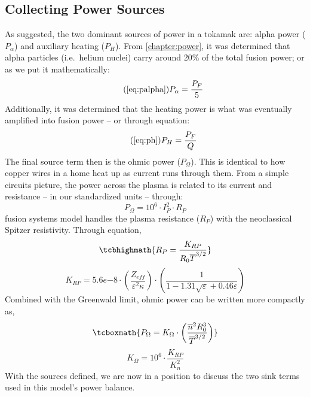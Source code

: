 \subsection{Collecting Power Sources}

As suggested, the two dominant sources of power in a tokamak are: alpha power ($P_\alpha$) and auxiliary heating ($P_H$). From \cref{chapter:power}, it was determined that alpha particles (i.e.\ helium nuclei) carry around 20\% of the total fusion power; or as we put it mathematically:
\begin{equation}
	\tag{\ref{eq:palpha}}
	P_\alpha = \frac{P_F}{5}
\end{equation}
Additionally, it was determined that the heating power is what was eventually amplified into fusion power -- or through equation:
\begin{equation}
	\tag{\ref{eq:ph}}
	P_H = \frac{P_F}{Q}
\end{equation}
The final source term then is the ohmic power ($P_\Omega$). This is identical to how copper wires in a home heat up as current runs through them. From a simple circuits picture, the power across the plasma is related to its current and resistance -- in our standardized units -- through:\cite{process}
\begin{equation}
	\label{eq:pohmic_basic}
	P_\Omega = 10^6 \cdot I_P^2 \cdot R_P
\end{equation}
 fusion systems model handles the plasma resistance ($R_P$)  with the neoclassical Spitzer resistivity. Through equation,
\begin{equation}
	\label{eq:rp}
	\tcbhighmath{
	R_P = \frac{K_{RP}}{R_0 \overline T ^ {3/2}}
	}
\end{equation}
\begin{equation}
	K_{RP} = 5.6e{-8} \cdot \left( \frac{ Z_{eff} }{ \varepsilon^2 \kappa } \right) \cdot \left( \frac{1}{ 1 - 1.31 \sqrt{ \varepsilon } + 0.46 \varepsilon } \right)
\end{equation}
Combined with the Greenwald limit, ohmic power can be written more compactly as,
\begin{equation}
	\label{eq:pohmic}
	\tcboxmath{
	P_\Omega = K_\Omega \cdot \left( \frac{ \overline n ^ 2 R_0^3 }{\overline T ^ {3/2}} \right)
	}
\end{equation}
\begin{equation}
	K_\Omega = 10^6 \cdot \frac{K_{RP}}{K_n^2}
\end{equation}
With the sources defined, we are now in a position to discuss the two sink terms used in this model's power balance.

